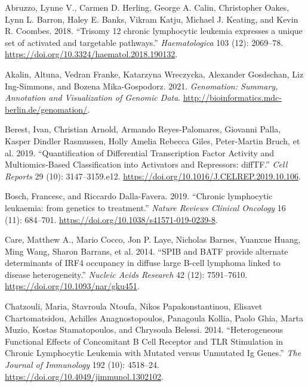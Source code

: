 \documentclass[11pt, a4paper, twosided]{book}
\newenvironment{CSLReferences}%
  {}%
  {\par}
\begin{document}
\hypertarget{refs}{}
\begin{CSLReferences}{1}{0}
\leavevmode{}%
Abruzzo, Lynne V., Carmen D. Herling, George A. Calin, Christopher Oakes, Lynn L. Barron, Haley E. Banks, Vikram Katju, Michael J. Keating, and Kevin R. Coombes. 2018. {``{Trisomy 12 chronic lymphocytic leukemia expresses a unique set of activated and targetable pathways}.''} \emph{Haematologica} 103 (12): 2069--78. \url{https://doi.org/10.3324/haematol.2018.190132}.

\leavevmode{}%
Akalin, Altuna, Vedran Franke, Katarzyna Wreczycka, Alexander Gosdschan, Liz Ing-Simmons, and Bozena Mika-Gospodorz. 2021. \emph{Genomation: Summary, Annotation and Visualization of Genomic Data}. \url{http://bioinformatics.mdc-berlin.de/genomation/}.

\leavevmode{}%
Berest, Ivan, Christian Arnold, Armando Reyes-Palomares, Giovanni Palla, Kasper Dindler Rasmussen, Holly Amelia Rebecca Giles, Peter-Martin Bruch, et al. 2019. {``{Quantification of Differential Transcription Factor Activity and Multiomics-Based Classification into Activators and Repressors: diffTF}.''} \emph{Cell Reports} 29 (10): 3147--3159.e12. \url{https://doi.org/10.1016/J.CELREP.2019.10.106}.

\leavevmode{}%
Bosch, Francesc, and Riccardo Dalla-Favera. 2019. {``{Chronic lymphocytic leukaemia: from genetics to treatment}.''} \emph{Nature Reviews Clinical Oncology} 16 (11): 684--701. \url{https://doi.org/10.1038/s41571-019-0239-8}.

\leavevmode{}%
Care, Matthew A., Mario Cocco, Jon P. Laye, Nicholas Barnes, Yuanxue Huang, Ming Wang, Sharon Barrans, et al. 2014. {``{SPIB and BATF provide alternate determinants of IRF4 occupancy in diffuse large B-cell lymphoma linked to disease heterogeneity}.''} \emph{Nucleic Acids Research} 42 (12): 7591--7610. \url{https://doi.org/10.1093/nar/gku451}.

\leavevmode{}%
Chatzouli, Maria, Stavroula Ntoufa, Nikos Papakonstantinou, Elisavet Chartomatsidou, Achilles Anagnostopoulos, Panagoula Kollia, Paolo Ghia, Marta Muzio, Kostas Stamatopoulos, and Chrysoula Belessi. 2014. {``{Heterogeneous Functional Effects of Concomitant B Cell Receptor and TLR Stimulation in Chronic Lymphocytic Leukemia with Mutated versus Unmutated Ig Genes}.''} \emph{The Journal of Immunology} 192 (10): 4518--24. \url{https://doi.org/10.4049/jimmunol.1302102}.


\end{CSLReferences}
\end{document}
